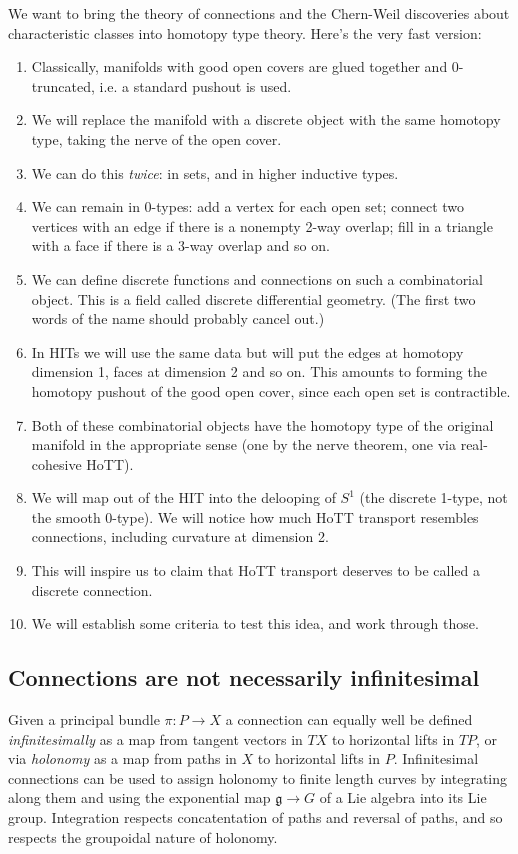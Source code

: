 \documentclass[12pt]{article}
\begin{document}
We want to bring the theory of connections and the Chern-Weil discoveries about characteristic classes into homotopy type theory. Here's the very fast version:
\begin{enumerate}
\item Classically, manifolds with good open covers are glued together and 0-truncated, i.e. a standard pushout is used.
\item We will replace the manifold with a discrete object with the same homotopy type, taking the nerve of the open cover.
\item We can do this \emph{twice}: in sets, and in higher inductive types.
\item We can remain in 0-types: add a vertex for each open set; connect two vertices with an edge if there is a nonempty 2-way overlap; fill in a triangle with a face if there is a 3-way overlap and so on.
\item We can define discrete functions and connections on such a combinatorial object. This is a field called discrete differential geometry. (The first two words of the name should probably cancel out.)
\item In HITs we will use the same data but will put the edges at homotopy dimension 1, faces at dimension 2 and so on. This amounts to forming the homotopy pushout of the good open cover, since each open set is contractible.
\item Both of these combinatorial objects have the homotopy type of the original manifold in the appropriate sense (one by the nerve theorem, one via real-cohesive HoTT).
\item We will map out of the HIT into the delooping of \( S^1 \) (the discrete 1-type, not the smooth 0-type). We will notice how much HoTT transport resembles connections, including curvature at dimension 2.
\item This will inspire us to claim that HoTT transport deserves to be called a discrete connection.
\item We will establish some criteria to test this idea, and work through those.
\end{enumerate}

\subsection{Connections are not necessarily infinitesimal}

Given a principal bundle \( \pi:P\to X \) a connection can equally well be defined \emph{infinitesimally} as a map from tangent vectors in \( TX \) to horizontal lifts in \( TP \), or via \emph{holonomy} as a map from paths in \( X \) to horizontal lifts in \( P \). Infinitesimal connections can be used to assign holonomy to finite length curves by integrating along them and using the exponential map \( \mathfrak{g}\to G \) of a Lie algebra into its Lie group. Integration respects concatentation of paths and reversal of paths, and so respects the groupoidal nature of holonomy.
\end{document}
